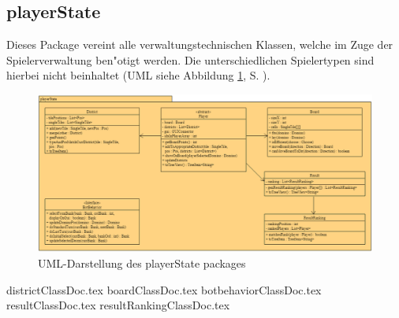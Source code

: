 \subsection{playerState}
\label{ss:playerState}
\FloatBarrier

Dieses Package vereint alle verwaltungstechnischen Klassen, welche im Zuge der Spielerverwaltung ben"otigt werden. Die unterschiedlichen Spielertypen sind hierbei nicht beinhaltet (UML siehe Abbildung \ref{fig:playerStatePackage}, S. \pageref{fig:playerStatePackage}). 

\begin{figure}
	\centering
	\includegraphics[width=\linewidth]{pics/playerStatePackage}
	\caption{UML-Darstellung des playerState packages}
	\label{fig:playerStatePackage}
\end{figure}

{districtClassDoc.tex}
{boardClassDoc.tex}
{botbehaviorClassDoc.tex}
{resultClassDoc.tex}
{resultRankingClassDoc.tex}
